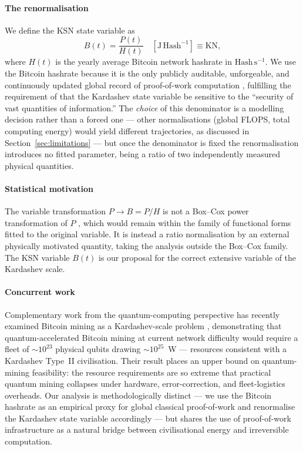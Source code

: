 \paragraph{The renormalisation} We define the KSN state variable as
\begin{equation}
\label{eq:ksn}
B(t) = \frac{P(t)}{H(t)}\quad [\mathrm{J\,Hash^{-1}}] \equiv \mathrm{KN},
\end{equation}
where $H(t)$ is the yearly average Bitcoin network hashrate in $\mathrm{Hash\,s^{-1}}$.
We use the Bitcoin hashrate because it is the only publicly auditable, unforgeable, and
continuously updated global record of proof-of-work computation \citep{Nakamoto2009},
fulfilling the requirement of \citet{Sagan1973} that the Kardashev state variable be
sensitive to the ``security of vast quantities of information.'' The \emph{choice} of this
denominator is a modelling decision rather than a forced one --- other normalisations
(global FLOPS, total computing energy) would yield different trajectories, as discussed in
Section~\ref{sec:limitations} --- but once the denominator is fixed the renormalisation
introduces no fitted parameter, being a ratio of two independently measured physical
quantities.

\paragraph{Statistical motivation} The variable transformation $P \to B = P/H$ is not a
Box--Cox power transformation of $P$ \citep{BoxCox1964}, which would remain within the
family of functional forms fitted to the original variable. It is instead a ratio
normalisation by an external physically motivated quantity, taking the analysis outside
the Box--Cox family. The KSN variable $B(t)$ is our proposal for the correct extensive
variable of the Kardashev scale.

\paragraph{Concurrent work} Complementary work from the quantum-computing perspective
has recently examined Bitcoin mining as a Kardashev-scale problem
\citep{DallaireDemers2026}, demonstrating that quantum-accelerated Bitcoin mining at
current network difficulty would require a fleet of $\sim10^{23}$ physical qubits drawing
$\sim10^{25}$~W --- resources consistent with a Kardashev Type~II civilisation. Their
result places an upper bound on quantum-mining feasibility: the resource requirements are
so extreme that practical quantum mining collapses under hardware, error-correction, and
fleet-logistics overheads. Our analysis is methodologically distinct --- we use the
Bitcoin hashrate as an empirical proxy for global classical proof-of-work and renormalise
the Kardashev state variable accordingly --- but shares the use of proof-of-work
infrastructure as a natural bridge between civilisational energy and irreversible
computation.


